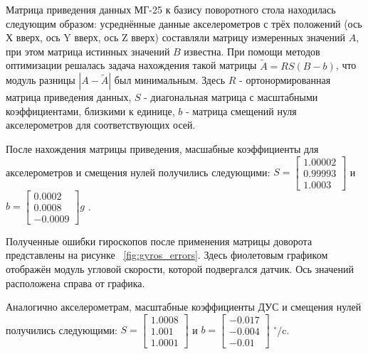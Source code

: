 \documentclass[a4paper,12pt]{article}
\begin{document}
Матрица приведения данных МГ-25 к базису поворотного стола находилась следующим образом: усреднённые данные акселерометров с трёх положений (ось Х вверх, ось Y вверх, ось Z вверх) составляли матрицу измеренных значений $A$, при этом матрица истинных значений $B$ известна. При помощи методов оптимизации решалась задача нахождения такой матрицы $\widetilde{A} = RS(B-b)$, что модуль разницы $|A-\widetilde{A}|$ был минимальным. Здесь $R$ - ортонормированная матрица приведения данных, $S$ - диагональная матрица с масштабными коэффициентами, близкими к единице, $b$ -  матрица смещений нуля акселерометров для соответствующих осей. 

После нахождения матрицы приведения, масшабные коэффициенты для акселерометров и смещения нулей получились следующими: $S = \begin{bmatrix} 1.00002 \\ 0.99993 \\1.0003 \end{bmatrix}$  и $b = \begin{bmatrix}  0.0002\\  0.0008\\ -0.0009 \end{bmatrix} g$
. 



Полученные ошибки гироскопов после применения матрицы доворота представлены на рисунке ~\ref{fig:gyros_errors}. Здесь фиолетовым графиком отображён модуль угловой скорости, которой подвергался датчик. Ось значений расположена справа от графика.

Аналогично акселерометрам, масштабные коэффициенты ДУС и смещения нулей получились следующими: $S = \begin{bmatrix} 1.0008 \\ 1.001 \\ 1.0001\end{bmatrix}$ и $b = \begin{bmatrix}  -0.017 \\ -0.004\\ -0.01\end{bmatrix}$ $^{\circ}$/c. 
\end{document}

